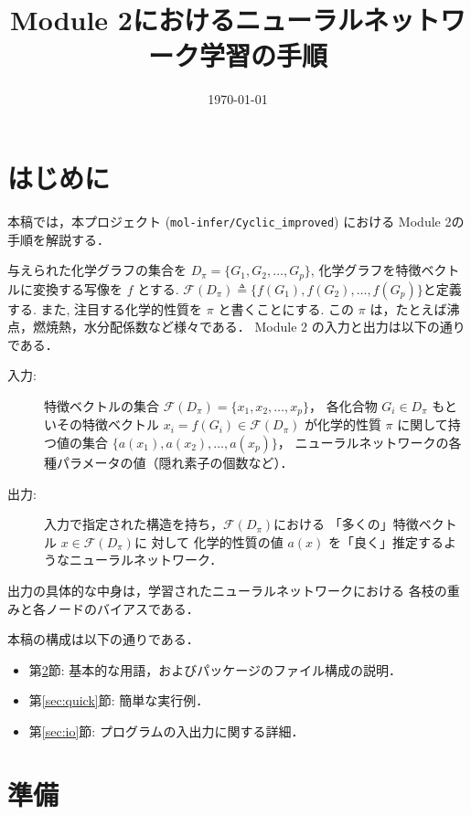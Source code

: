 \documentclass[11pt, titlepage, dvipdfmx, twoside]{jarticle}
\title{\huge Module 2におけるニューラルネットワーク学習の手順}
\author{\project}
\newcommand{\project}{{\tt mol-infer/Cyclic\_improved}}
\newcommand{\secref}[1]{第\ref{sec:#1}節}
\begin{document}
\makeatletter 
\let\c@lstlisting\c@figure
\makeatother
{}
\date{\today}
\maketitle
\thispagestyle{empty}
\tableofcontents
\clearpage
{}


\section{はじめに}
本稿では，本プロジェクト (\project) における Module 2の手順を解説する．

与えられた化学グラフの集合を $D_\pi=\{G_1,G_2,\dots,G_p\}$,
化学グラフを特徴ベクトルに変換する写像を $f$ とする.
${\mathcal F}(D_\pi)\triangleq\{f(G_1),f(G_2),\dots,f(G_p)\}$と定義する. 
また, 注目する化学的性質を $\pi$ と書くことにする.
この $\pi$ は，たとえば沸点，燃焼熱，水分配係数など様々である．
Module 2 の入力と出力は以下の通りである．

\begin{oframed}
\begin{description}
\item[入力:] 特徴ベクトルの集合 ${\mathcal F}(D_\pi)=\{x_1,x_2,\dots,x_p\}$，
  各化合物 $G_i\in D_\pi$ もといその特徴ベクトル $x_i=f(G_i)\in{\mathcal F}(D_\pi)$
  が化学的性質 $\pi$ に関して持つ値の集合 $\{a(x_1),a(x_2),\dots,a(x_p)\}$，
  ニューラルネットワークの各種パラメータの値（隠れ素子の個数など）．
\item[出力:] 入力で指定された構造を持ち，${\mathcal F}(D_\pi)$における
  「多くの」特徴ベクトル $x\in {\mathcal F}(D_\pi)$に
  対して
  化学的性質の値 $a(x)$ を「良く」推定するようなニューラルネットワーク．
\end{description}
\end{oframed}
出力の具体的な中身は，学習されたニューラルネットワークにおける
各枝の重みと各ノードのバイアスである．

本稿の構成は以下の通りである．
\begin{itemize}
\item \secref{preparation}: 基本的な用語，およびパッケージのファイル構成の説明．
\item \secref{quick}: 簡単な実行例．
\item \secref{io}: プログラムの入出力に関する詳細．
\end{itemize}

\newpage
\section{準備}
\label{sec:preparation}
\end{document}
